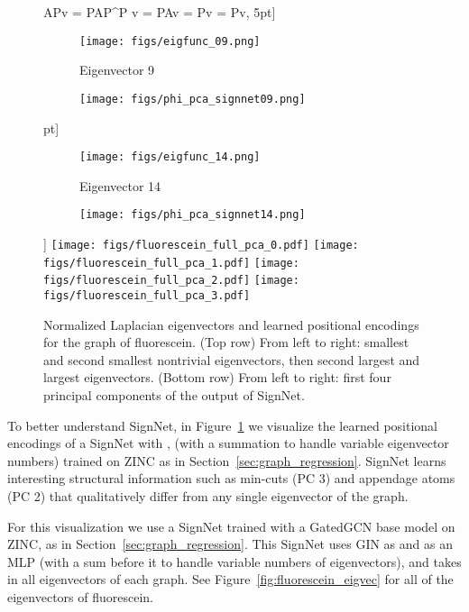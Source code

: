 \documentclass{article} \usepackage{iclr2023_conference,times}
\begin{document}
\begin{figure}[ht]
    APv = PAP^\top P v = PAv = P\lambda v = \lambda Pv,
5pt]
    
    \begin{subfigure}{.4\columnwidth}
    \centering
    \texttt{[image: figs/eigfunc\_09.png]}
    \caption{Eigenvector 9}
    \end{subfigure} 
    \begin{subfigure}{.4\columnwidth}
    \centering
    \texttt{[image: figs/phi\_pca\_signnet09.png]}
    \caption{}
    \end{subfigure} \5pt]
    
    \begin{subfigure}{.4\columnwidth}
    \centering
    \texttt{[image: figs/eigfunc\_14.png]}
    \caption{Eigenvector 14}
    \end{subfigure} 
    \begin{subfigure}{.4\columnwidth}
    \centering
    \texttt{[image: figs/phi\_pca\_signnet14.png]}
    \caption{}
    \end{subfigure} \10pt]
    \texttt{[image: figs/fluorescein\_full\_pca\_0.pdf]}
    \texttt{[image: figs/fluorescein\_full\_pca\_1.pdf]}
    \texttt{[image: figs/fluorescein\_full\_pca\_2.pdf]}
    \hspace{2.1pt}\texttt{[image: figs/fluorescein\_full\_pca\_3.pdf]}
    \caption{Normalized Laplacian eigenvectors and learned positional encodings for the graph of  fluorescein. (Top row) From left to right: smallest and second smallest nontrivial eigenvectors, then second largest and largest eigenvectors. (Bottom row) From left to right: first four principal components of the output  of SignNet. 
    }
    \label{fig:visualize_molecule}
\end{figure}

To better understand SignNet, in Figure~\ref{fig:visualize_molecule} we visualize the learned positional encodings of a SignNet with ,  (with a summation to handle variable eigenvector numbers)  trained on ZINC as in Section~\ref{sec:graph_regression}.
 SignNet learns interesting structural information such as min-cuts (PC 3) and appendage atoms (PC 2) that qualitatively differ from any single eigenvector of the graph. 

For this visualization we use a SignNet trained with a GatedGCN base model on ZINC, as in Section~\ref{sec:graph_regression}. This SignNet uses GIN as  and  as an MLP (with a sum before it to handle variable numbers of eigenvectors), and takes in all eigenvectors of each graph. See Figure~\ref{fig:fluorescein_eigvec} for all of the eigenvectors of fluorescein.
\end{document}
